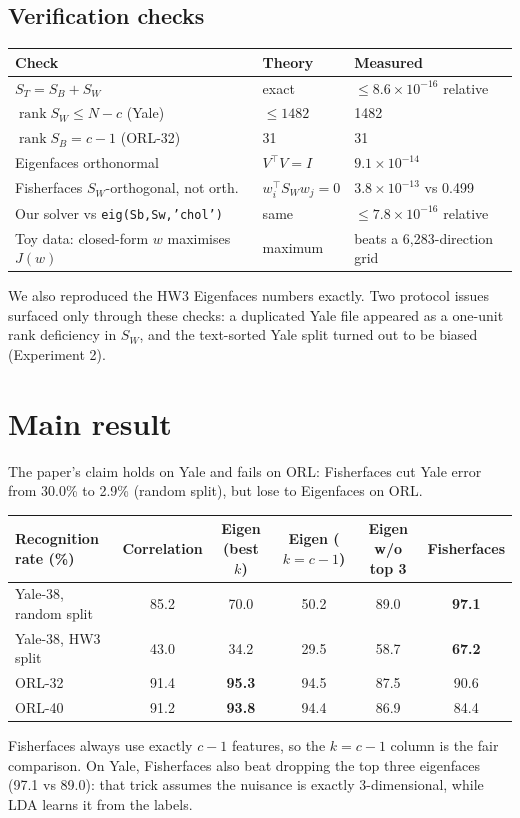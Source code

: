 \documentclass[11pt]{article}
\newcommand{\T}{^{\top}}
\begin{document}
\subsection*{Verification checks}
\begin{center}
\begin{tabular}{lll}\toprule
Check & Theory & Measured\\\midrule
$S_T=S_B+S_W$ & exact & $\le 8.6\times10^{-16}$ relative\\
$\operatorname{rank}S_W\le N-c$ (Yale) & $\le1482$ & 1482\\
$\operatorname{rank}S_B=c-1$ (ORL-32) & 31 & 31\\
Eigenfaces orthonormal & $V\T V=I$ & $9.1\times10^{-14}$\\
Fisherfaces $S_W$-orthogonal, not orth. & $w_i\T S_Ww_j=0$ & $3.8\times10^{-13}$ vs 0.499\\
Our solver vs \texttt{eig(Sb,Sw,'chol')} & same & $\le7.8\times10^{-16}$ relative\\
Toy data: closed-form $w$ maximises $J(w)$ & maximum & beats a 6,283-direction grid\\\bottomrule
\end{tabular}
\end{center}
We also reproduced the HW3 Eigenfaces numbers exactly. Two protocol issues surfaced only through these checks: a duplicated Yale file appeared as a one-unit rank deficiency in $S_W$, and the text-sorted Yale split turned out to be biased (Experiment 2).

\section{Main result}
The paper's claim holds on Yale and fails on ORL: Fisherfaces cut Yale error from 30.0\% to 2.9\% (random split), but lose to Eigenfaces on ORL.
\begin{center}\small
\begin{tabular}{lccccc}\toprule
Recognition rate (\%) & Correlation & Eigen (best $k$) & Eigen ($k=c-1$) & Eigen w/o top 3 & Fisherfaces\\\midrule
Yale-38, random split & 85.2 & 70.0 & 50.2 & 89.0 & \textbf{97.1}\\
Yale-38, HW3 split & 43.0 & 34.2 & 29.5 & 58.7 & \textbf{67.2}\\
ORL-32 & 91.4 & \textbf{95.3} & 94.5 & 87.5 & 90.6\\
ORL-40 & 91.2 & \textbf{93.8} & 94.4 & 86.9 & 84.4\\\bottomrule
\end{tabular}
\end{center}
Fisherfaces always use exactly $c-1$ features, so the $k=c-1$ column is the fair comparison. On Yale, Fisherfaces also beat dropping the top three eigenfaces (97.1 vs 89.0): that trick assumes the nuisance is exactly 3-dimensional, while LDA learns it from the labels.
\end{document}
